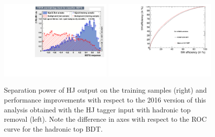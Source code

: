 \begin{figure}[htp]
\centering
\includegraphics[width=0.49\textwidth]{ch9_figs/Jtagger_Ks.pdf}
\includegraphics[width=0.49\textwidth]{ch9_figs/Roc_Comparison_18Feb.pdf}
\caption[Performance improvement from the HJ tagger and hadronic top removal]{Separation power of HJ output on the training samples (right) and performance improvements with respect to the 2016 version of this analysis obtained with the HJ
tagger input with hadronic top removal (left). Note the difference in axes with respect to the ROC curve for the hadronic top BDT.}
\label{fig:hj_tagger}
\end{figure}

